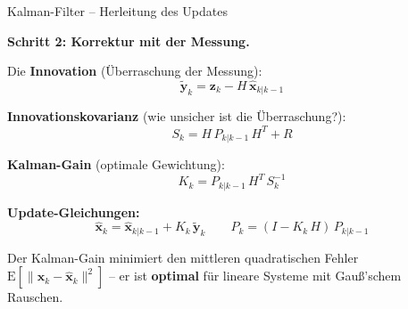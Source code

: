 \documentclass[%
  aspectratio=169,
  10pt
]{beamer}
\newcommand{\hl}[1]{{\color{fbblau}\textbf{#1}}}
\begin{document}
\begin{frame}{Kalman-Filter -- Herleitung des Updates}

\textbf{Schritt 2: Korrektur mit der Messung.}

Die \hl{Innovation} (Überraschung der Messung):
\[
  \tilde{\mathbf{y}}_k = \mathbf{z}_k - H\,\hat{\mathbf{x}}_{k|k-1}
\]

\pause
\textbf{Innovationskovarianz} (wie unsicher ist die Überraschung?):
\[
  S_k = H\,P_{k|k-1}\,H^T + R
\]

\pause
\textbf{Kalman-Gain} (optimale Gewichtung):
\[
  \boxed{K_k = P_{k|k-1}\,H^T\,S_k^{-1}}
\]

\pause
\textbf{Update-Gleichungen:}
\[
  \boxed{\hat{\mathbf{x}}_k = \hat{\mathbf{x}}_{k|k-1} + K_k\,\tilde{\mathbf{y}}_k}
  \qquad
  \boxed{P_k = (I - K_k\,H)\,P_{k|k-1}}
\]

\vspace{1mm}
Der Kalman-Gain minimiert den mittleren quadratischen Fehler
$\mathrm{E}[\|\mathbf{x}_k - \hat{\mathbf{x}}_k\|^2]$ -- er ist
\hl{optimal} für lineare Systeme mit Gauß'schem Rauschen.

\end{frame}
\end{document}
